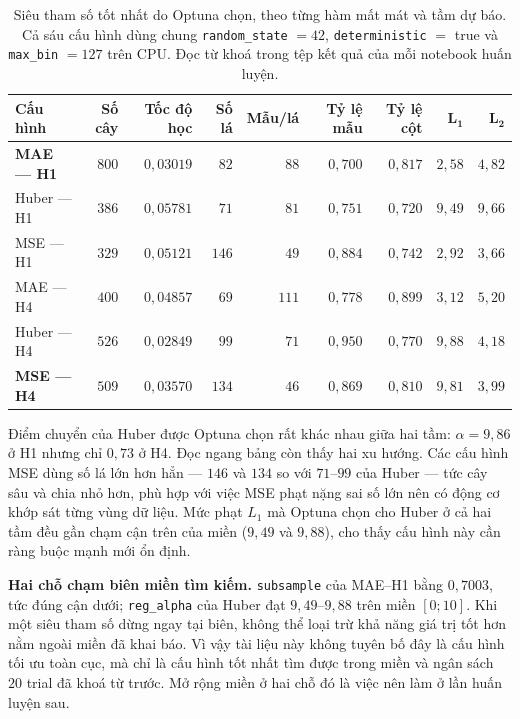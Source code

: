 \documentclass[12pt,a4paper]{article}
\DeclareRobustCommand{\tep}[1]{\texttt{\detokenize{#1}}}
\begin{document}
\begin{table}[htbp]
\centering
\caption{Siêu tham số tốt nhất do Optuna chọn, theo từng hàm mất mát và tầm dự báo. Cả sáu cấu
hình dùng chung \texttt{random\_state} $=42$, \texttt{deterministic} $=$ true và
\texttt{max\_bin} $=127$ trên CPU. Đọc từ khoá \tep{best_params} trong tệp kết quả của mỗi
notebook huấn luyện.}
\label{tab:sieu_tham_so}
\scriptsize
\begin{tabular}{l r r r r r r r r}
\toprule
\textbf{Cấu hình} & \textbf{Số cây} & \textbf{Tốc độ học} & \textbf{Số lá} &
\textbf{Mẫu/lá} & \textbf{Tỷ lệ mẫu} & \textbf{Tỷ lệ cột} & $\boldsymbol{L_1}$ & $\boldsymbol{L_2}$ \\
\midrule
\textbf{MAE --- H1}  & $800$ & $0{,}03019$ & $82$  & $88$ & $0{,}700$ & $0{,}817$ & $2{,}58$ & $4{,}82$ \\
Huber --- H1         & $386$ & $0{,}05781$ & $71$  & $81$ & $0{,}751$ & $0{,}720$ & $9{,}49$ & $9{,}66$ \\
MSE --- H1           & $329$ & $0{,}05121$ & $146$ & $49$ & $0{,}884$ & $0{,}742$ & $2{,}92$ & $3{,}66$ \\
\addlinespace
MAE --- H4           & $400$ & $0{,}04857$ & $69$  & $111$ & $0{,}778$ & $0{,}899$ & $3{,}12$ & $5{,}20$ \\
Huber --- H4         & $526$ & $0{,}02849$ & $99$  & $71$ & $0{,}950$ & $0{,}770$ & $9{,}88$ & $4{,}18$ \\
\textbf{MSE --- H4}  & $509$ & $0{,}03570$ & $134$ & $46$ & $0{,}869$ & $0{,}810$ & $9{,}81$ & $3{,}99$ \\
\bottomrule
\end{tabular}
\end{table}

Điểm chuyển của Huber được Optuna chọn rất khác nhau giữa hai tầm: $\alpha = 9{,}86$ ở H1 nhưng
chỉ $0{,}73$ ở H4. Đọc ngang bảng còn thấy hai xu hướng. Các cấu hình MSE dùng số lá lớn hơn
hẳn --- $146$ và $134$ so với $71$--$99$ của Huber --- tức cây sâu và chia nhỏ hơn, phù hợp với
việc MSE phạt nặng sai số lớn nên có động cơ khớp sát từng vùng dữ liệu. Mức phạt $L_1$ mà
Optuna chọn cho Huber ở cả hai tầm đều gần chạm cận trên của miền ($9{,}49$ và $9{,}88$), cho
thấy cấu hình này cần ràng buộc mạnh mới ổn định.

\textbf{Hai chỗ chạm biên miền tìm kiếm.} \texttt{subsample} của MAE--H1 bằng $0{,}7003$, tức
đúng cận dưới; \texttt{reg\_alpha} của Huber đạt $9{,}49$--$9{,}88$ trên miền $[0;10]$. Khi một
siêu tham số dừng ngay tại biên, không thể loại trừ khả năng giá trị tốt hơn nằm ngoài miền đã
khai báo. Vì vậy tài liệu này không tuyên bố đây là cấu hình tối ưu toàn cục, mà chỉ là cấu
hình tốt nhất tìm được trong miền và ngân sách $20$ trial đã khoá từ trước. Mở rộng miền ở hai
chỗ đó là việc nên làm ở lần huấn luyện sau.
\end{document}
